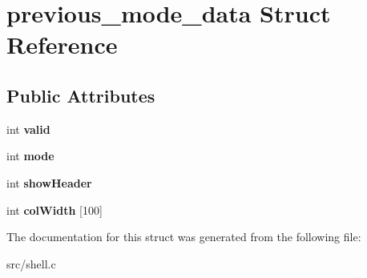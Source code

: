 \hypertarget{structprevious__mode__data}{\section{previous\-\_\-mode\-\_\-data Struct Reference}
\label{structprevious__mode__data}
}
\subsection*{Public Attributes}
\begin{DoxyCompactItemize}
\item 
\hypertarget{structprevious__mode__data_a0e739c09db970af70b080b011bd7b313}{int {\bfseries valid}}\label{structprevious__mode__data_a0e739c09db970af70b080b011bd7b313}

\item 
\hypertarget{structprevious__mode__data_affec08bf41351e87a503ea2100f1699a}{int {\bfseries mode}}\label{structprevious__mode__data_affec08bf41351e87a503ea2100f1699a}

\item 
\hypertarget{structprevious__mode__data_af12c8f5a7060d22aec1653274c48412a}{int {\bfseries show\-Header}}\label{structprevious__mode__data_af12c8f5a7060d22aec1653274c48412a}

\item 
\hypertarget{structprevious__mode__data_a5f3ed3d6f0f8fce802648dfa3922783b}{int {\bfseries col\-Width} \mbox{[}100\mbox{]}}\label{structprevious__mode__data_a5f3ed3d6f0f8fce802648dfa3922783b}

\end{DoxyCompactItemize}


The documentation for this struct was generated from the following file\-:\begin{DoxyCompactItemize}
\item 
src/shell.\-c\end{DoxyCompactItemize}
